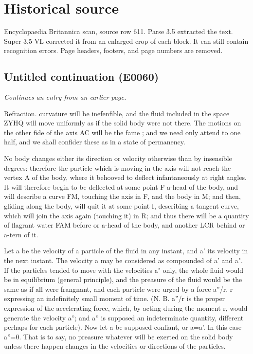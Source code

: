 \documentclass{article}
\begin{document}
\section*{Historical source}
Encyclopaedia Britannica scan, source row 611. Parse 3.5 extracted the text. Super 3.5 VL corrected it from an enlarged crop of each block. It can still contain recognition errors.
Page headers, footers, and page numbers are removed.

\subsection*{Untitled continuation (E0060)}
\textit{Continues an entry from an earlier page.}

Refraction. curvature will be inefenfible, and the fluid included in the space ZYHQ will move uniformly as if the solid body were not there. The motions on the other fide of the axis AC will be the fame ; and we need only attend to one half, and we shall confider these as in a state of permanency.

No body changes either its direction or velocity otherwise than by insensible degrees: therefore the particle which is moving in the axis will not reach the vertex A of the body, where it behooved to deflect infantaneously at right angles. It will therefore begin to be deflected at some point F a-head of the body, and will describe a curve FM, touching the axis in F, and the body in M; and then, gliding along the body, will quit it at some point I, describing a tangent curve, which will join the axis again (touching it) in R; and thus there will be a quantity of flagrant water FAM before or a-head of the body, and another LCR behind or a-tern of it.

Let a be the velocity of a particle of the fluid in any instant, and a' its velocity in the next instant. The velocity a may be considered as compounded of a' and a". If the particles tended to move with the velocities a" only, the whole fluid would be in equilibrium (general principle), and the preasure of the fluid would be the same as if all were frangnant, and each particle were urged by a force a''/r, r expressing an indefinitely small moment of time. (N. B. a''/r is the proper expression of the accelerating force, which, by acting during the moment r, would generate the velocity a''; and a'' is supposed an indeterminate quantity, different perhaps for each particle). Now let a be supposed confiant, or a=a'. In this case a''=0. That is to say, no preasure whatever will be exerted on the solid body unless there happen changes in the velocities or directions of the particles.
\end{document}
